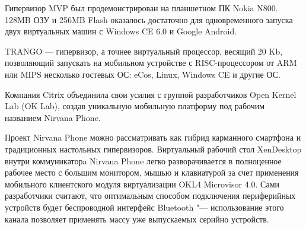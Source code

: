 \documentclass[10pt, a5paper]{article}
\begin{document}
Гипервизор MVP был продемонстрирован на планшетном ПК Nokia N800. 128MB ОЗУ и 256MB Flash оказалось достаточно для одновременного запуска двух виртуальных машин с Windows CE 6.0 и Google Android.

TRANGO --- гипервизор, а точнее виртуальный процессор, весящий 20 Kb, позволяющий запускать на мобильном устройстве с RISC-процессором от ARM или MIPS несколько гостевых ОС: eCos, Linux, Windows CE и другие ОС.

Компания Citrix объединила свои усилия с группой разработчиков Open Kernel Lab (OK Lab), создав уникальную мобильную платформу под рабочим названием Nirvana Phone.

Проект Nirvana Phone можно рассматривать как гибрид карманного смартфона и традиционных настольных гипервизоров. Виртуальный рабочий стол XenDesktop внутри коммуникаторa Nirvana Phone легко разворачивается в полноценное рабочее место с большим монитором, мышью и клавиатурой за счет применения мобильного клиентского модуля виртуализации OKL4 Microvisor 4.0. Сами разработчики считают, что оптимальным способом подключения периферийных устройств будет беспроводной интерфейс \linebreak Bluetooth "--- использование этого канала позволяет применять массу уже выпускаемых серийно устройств.
\end{document}
